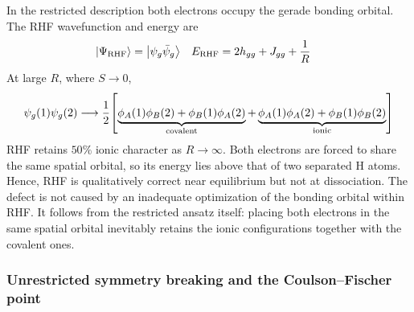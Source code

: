 \documentclass[11pt,a4paper,titlepage]{article}
\numberwithin{equation}{section}
\newcommand{\red}[1]{\textcolor{hfRed}{#1}}
\begin{document}
In the restricted description both electrons occupy the gerade bonding
orbital. The RHF wavefunction and energy are
\begin{align}
  \ket{\Psi_\text{RHF}}&=\ket{\psi_g\Bar{\psi}_g}
  &
  E_\text{RHF}&=2h_{gg}+J_{gg}+\frac{1}{R}
\end{align}
At large $R$, where $S\rightarrow0$,
\begin{equation}
  \psi_g(1)\psi_g(2)\longrightarrow\frac{1}{2}\qty[
    \underbrace{\phi_A(1)\phi_B(2)+\phi_B(1)\phi_A(2)}
      _{\text{covalent}}
    +\underbrace{\phi_A(1)\phi_A(2)+\phi_B(1)\phi_B(2)}
      _{\text{ionic}}
  ]
\end{equation}
RHF retains \red{$50\%$ ionic character} as $R\rightarrow\infty$. Both
electrons are forced to share the same spatial orbital, so its energy lies
above that of two separated H atoms. Hence, RHF is qualitatively correct
near equilibrium but not at dissociation.
The defect is not caused by an inadequate optimization of the bonding orbital
within RHF. It follows from the restricted ansatz itself: placing both
electrons in the same spatial orbital inevitably retains the ionic
configurations together with the covalent ones.

\subsubsection{Unrestricted symmetry breaking and the Coulson--Fischer point}

\hfBioCoulsonFischer
\end{document}
